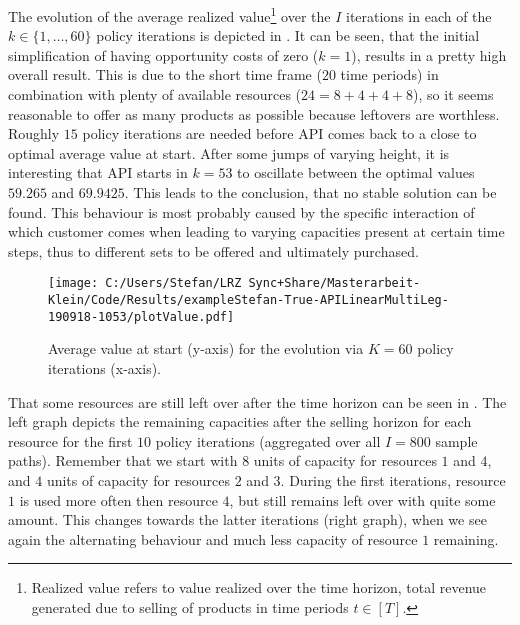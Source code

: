 The evolution of the average realized value\footnote{Realized value refers to value realized over the time horizon, \ie total revenue generated due to selling of products in time periods $t\in [T]$.} over the $I$ iterations in each of the $k \in \{1, \dots, 60\}$ policy iterations is depicted in . It can be seen, that the initial simplification of having opportunity costs of zero ($k=1$), results in a pretty high overall result. This is due to the short time frame ($20$ time periods) in combination with plenty of available resources ($24 = 8+4+4+8$), so it seems reasonable to offer as many products as possible because leftovers are worthless. Roughly $15$ policy iterations are needed before API comes back to a close to optimal average value at start. After some jumps of varying height, it is interesting that API starts in $k=53$ to oscillate between the optimal values $59.265$ and $69.9425$. This leads to the conclusion, that no stable solution can be found. This behaviour is most probably caused by the specific interaction of which customer comes when leading to varying capacities present at certain time steps, thus to different sets to be offered and ultimately purchased.

\begin{figure}[H]
	\centering
	\texttt{[image: C:/Users/Stefan/LRZ Sync+Share/Masterarbeit-Klein/Code/Results/exampleStefan-True-APILinearMultiLeg-190918-1053/plotValue.pdf]}
	\caption[Average value at start for the evolution via $K=60$ policy iterations.]{\label{fig-adp-valueFunc}Average value at start (y-axis) for the evolution via $K=60$ policy iterations (x-axis).}
\end{figure}

That some resources are still left over after the time horizon can be seen in . The left graph depicts the remaining capacities after the selling horizon for each resource for the first $10$ policy iterations (aggregated over all $I=800$ sample paths). Remember that we start with $8$ units of capacity for resources $1$ and $4$, and $4$ units of capacity for resources $2$ and $3$. During the first iterations, resource $1$ is used more often then resource $4$, but still remains left over with quite some amount. This changes towards the latter iterations (right graph), when we see again the alternating behaviour and much less capacity of resource $1$ remaining.


